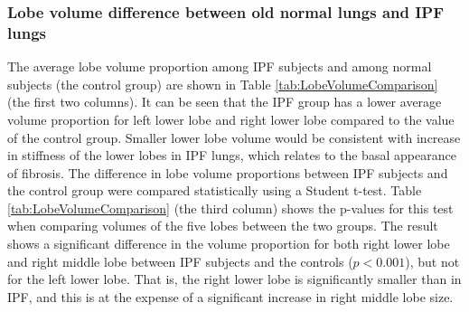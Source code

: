 
\subsubsection{Lobe volume difference between old normal lungs and IPF lungs}
The average lobe volume proportion among IPF subjects and among normal subjects (the control group) are shown in Table \ref{tab:LobeVolumeComparison} (the first two columns). It can be seen that the IPF group has a lower average volume proportion for left lower lobe and right lower lobe compared to the value of the control group. Smaller lower lobe volume would be consistent with increase in stiffness of the lower lobes in IPF lungs, which relates to the basal appearance of fibrosis. The difference in lobe volume proportions between IPF subjects and the control group were compared statistically using a Student t-test. Table \ref{tab:LobeVolumeComparison} (the third column) shows the p-values for this test when comparing volumes of the five lobes between the two groups. The result shows a significant difference in the volume proportion for both right lower lobe and right middle lobe between IPF subjects and the controls ($p<0.001$), but not for the left lower lobe. That is, the right lower lobe is significantly smaller than in IPF, and this is at the expense of a significant increase in right middle lobe size.

